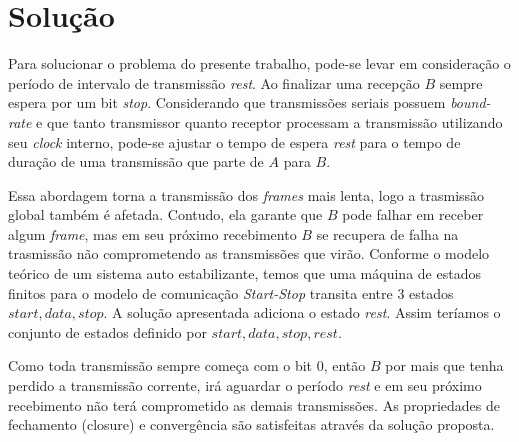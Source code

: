 
\section{Solução}

Para solucionar o problema do presente trabalho, pode-se 
levar em consideração o período de intervalo de transmissão \emph{rest}.
Ao finalizar uma recepção $B$ sempre espera por um bit \emph{stop}. 
Considerando que transmissões seriais possuem \emph{bound-rate} e que 
tanto transmissor quanto receptor processam a transmissão utilizando
seu \emph{clock} interno, pode-se ajustar o tempo de espera 
\emph{rest} para o tempo de duração de uma transmissão que parte de $A$ 
para $B$. 

Essa abordagem torna a transmissão dos \emph{frames} mais lenta, logo 
a trasmissão global também é afetada. 
Contudo, ela garante que $B$ pode falhar em receber algum \emph{frame}, 
mas em seu próximo recebimento $B$ se recupera de falha na trasmissão 
não comprometendo as transmissões que virão.
Conforme o modelo teórico de um sistema auto estabilizante, temos que uma 
máquina de estados finitos para o modelo de comunicação \emph{Start-Stop}
transita entre 3 estados ${start, data, stop}$. 
A solução apresentada adiciona o estado \emph{rest}. 
Assim teríamos o conjunto de estados definido por ${start, data, stop, rest}$.

Como toda transmissão sempre começa com o bit 0, então $B$ por mais que
tenha perdido a transmissão corrente, irá aguardar o período \emph{rest}
e em seu próximo recebimento não terá comprometido as demais transmissões.
As propriedades de fechamento (closure) e convergência são satisfeitas 
através da solução proposta. 
